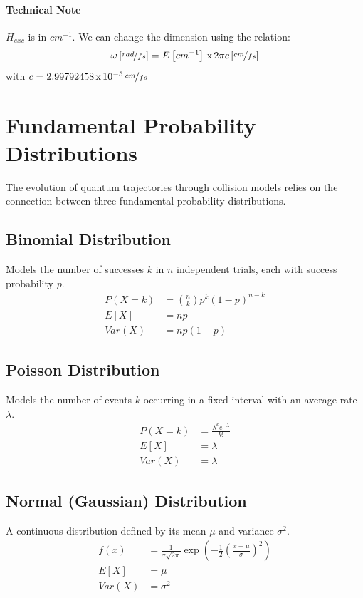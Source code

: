 \documentclass[a4paper,12pt]{article}
\begin{document}
\paragraph{Technical Note} $ H_{exc} $ is in $ cm^{-1} $. We can change the dimension using the relation: 
\begin{equation}
	\omega \left[\nicefrac{rad}{fs}\right] = E \left[cm^{-1}\right] \, \text{x} \, 2 \pi c \left[ \nicefrac{cm}{fs} \right]
\end{equation}
with $ c = 2.99792458 \, \text{x} \, 10^{-5} \, \nicefrac{cm}{fs} $

\section{Fundamental Probability Distributions}

The evolution of quantum trajectories through collision models relies on the connection between three fundamental probability distributions.

\subsection{Binomial Distribution}
Models the number of successes $k$ in $n$ independent trials, each with success probability $p$.
\begin{align}
	P(X = k) &= \binom{n}{k} p^k (1-p)^{n-k} \\
	E[X] &= np \\
	Var(X) &= np(1-p)
\end{align}

\subsection{Poisson Distribution}
Models the number of events $k$ occurring in a fixed interval with an average rate $\lambda$.
\begin{align}
	P(X = k) &= \frac{\lambda^k e^{-\lambda}}{k!} \\
	E[X] &= \lambda \\
	Var(X) &= \lambda
\end{align}

\subsection{Normal (Gaussian) Distribution}
A continuous distribution defined by its mean $\mu$ and variance $\sigma^2$.
\begin{align}
	f(x) &= \frac{1}{\sigma \sqrt{2\pi}} \exp\left(-\frac{1}{2}\left(\frac{x-\mu}{\sigma}\right)^2\right) \\
	E[X] &= \mu \\
	Var(X) &= \sigma^2
\end{align}
\end{document}
